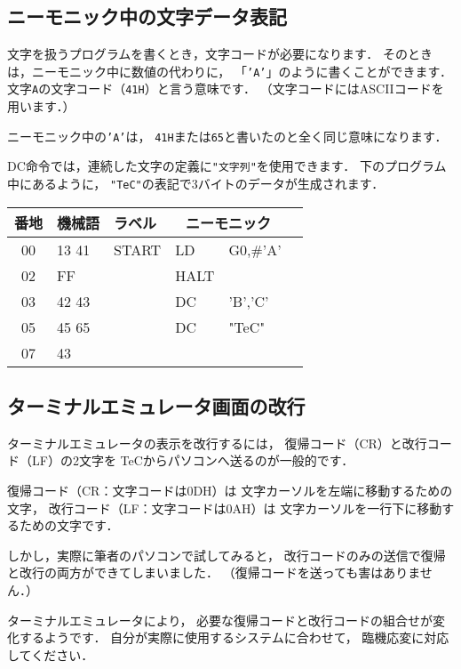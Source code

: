 \begin{framed}
\subsection*{ニーモニック中の文字データ表記}

文字を扱うプログラムを書くとき，文字コードが必要になります．
そのときは，ニーモニック中に数値の代わりに，
「{\tt 'A'}」のように書くことができます．
文字{\tt A}の文字コード（{\tt 41H}）と言う意味です．
（文字コードにはASCIIコードを用います．）

ニーモニック中の{\tt 'A'}は，
{\tt 41H}または{\tt 65}と書いたのと全く同じ意味になります．

DC命令では，連続した文字の定義に{\tt "文字列"}を使用できます．
下のプログラム中にあるように，
{\tt "TeC"}の表記で3バイトのデータが生成されます．

{\tt\small\begin{center}
\begin{tabular}{|c|l|l|l l|l}
\hline
番地 & 機械語 & ラベル & \multicolumn{2}{|c|}{ニーモニック} \\
\hline
00 & 13 41 & START & LD   & G0,\#'A'        \\
02 & FF    &       & HALT &                 \\ 
03 & 42 43 &       & DC   & 'B','C'         \\ 
05 & 45 65 &       & DC   & "TeC"           \\ 
07 & 43    &       &      &                 \\
\hline
\end{tabular}
\end{center}}
\end{framed}

\begin{framed}
\subsection*{ターミナルエミュレータ画面の改行}

ターミナルエミュレータの表示を改行するには，
復帰コード（CR）と改行コード（LF）の2文字を
TeCからパソコンへ送るのが一般的です．

復帰コード（CR：文字コードは0DH）は
文字カーソルを左端に移動するための文字，
改行コード（LF：文字コードは0AH）は
文字カーソルを一行下に移動するための文字です．

しかし，実際に筆者のパソコンで試してみると，
改行コードのみの送信で復帰と改行の両方ができてしまいました．
（復帰コードを送っても害はありません．）

ターミナルエミュレータにより，
必要な復帰コードと改行コードの組合せが変化するようです．
自分が実際に使用するシステムに合わせて，
臨機応変に対応してください．

\end{framed}

